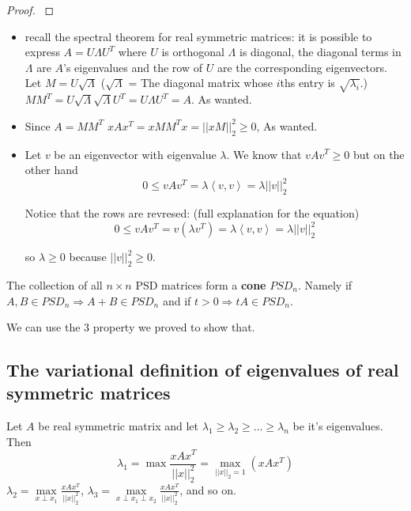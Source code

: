 \begin{proof}
$ $
\end{proof}
\begin{itemize}
\item[$1\Rightarrow2$:]  recall the spectral theorem for real symmetric matrices: it is possible
to express $A=U\Lambda U^{T}$ where $U$ is orthogonal $\Lambda$
is diagonal, the diagonal terms in $\Lambda$ are $A$'s eigenvalues
and the row of $U$ are the corresponding eigenvectors. Let $M=U\sqrt{\Lambda}$
($\sqrt{\Lambda}$ = The diagonal matrix whose $i$ths entry is $\sqrt{\lambda_{i}}$.)
$MM^{T}=U\sqrt{\Lambda}\sqrt{\Lambda}U^{T}=U\Lambda U^{T}=A$. As
wanted.
\item[$2\Rightarrow3$:]  Since $A=MM^{T}$ $xAx^{T}=xMM^{T}x=\left|\left|xM\right|\right|_{2}^{2}\ge0$,
As wanted.
\item[$3\Rightarrow1$:]  Let $v$ be an eigenvector with eigenvalue $\lambda$. We know that
$vAv^{T}\ge0$ but on the other hand 
\[
0\le vAv^{T}=\lambda\left\langle v,v\right\rangle =\lambda\left|\left|v\right|\right|_{2}^{2}
\]
\begin{insight}
Notice that the rows are revresed: (full explanation for the equation)
\[
0\le vAv^{T}=v\left(\lambda v^{T}\right)=\lambda\left\langle v,v\right\rangle =\lambda\left|\left|v\right|\right|_{2}^{2}
\]
\end{insight}
{} so $\lambda\ge0$ because $\left|\left|v\right|\right|_{2}^{2}\ge0$.
\end{itemize}
\begin{corollary}
The collection of all $n\times n$ PSD matrices form a \textbf{cone}
$PSD_{n}$. Namely if $A,B\in PSD_{n}\Rightarrow A+B\in PSD_{n}$
and if $t>0\Rightarrow tA\in PSD_{n}$.%
\begin{insight}
We can use the 3 property we proved to show that.%
\end{insight}
\end{corollary}


\subsection{The variational definition of eigenvalues of real symmetric matrices}
\begin{thm}
 Let $A$ be real symmetric matrix and let $\lambda_{1}\ge\lambda_{2}\ge\dots\ge\lambda_{n}$
be it's eigenvalues. Then 
\[
\lambda_{1}=\max\frac{xAx^{T}}{\left|\left|x\right|\right|_{2}^{2}}=\max\limits _{\left|\left|x\right|\right|_{2}=1}\left(xAx^{T}\right)
\]
$\lambda_{2}=\max\limits _{x\perp x_{1}}\frac{xAx^{T}}{\left|\left|x\right|\right|_{2}^{2}}$,
$\lambda_{3}=\max\limits _{x\perp x_{1}\perp x_{2}}\frac{xAx^{T}}{\left|\left|x\right|\right|_{2}^{2}}$,
and so on. 
\end{thm}

